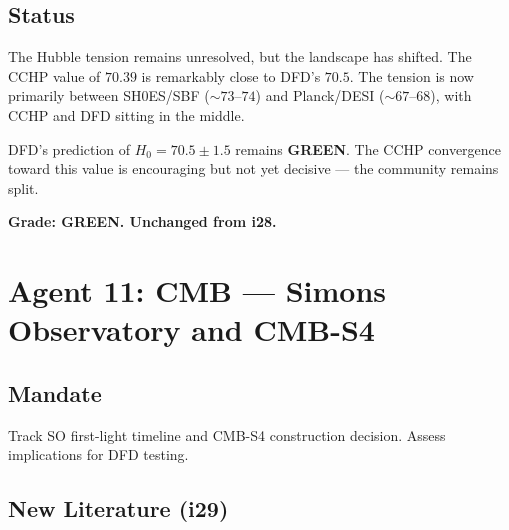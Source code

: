 \documentclass[11pt,a4paper]{article}
\begin{document}
\subsection{Status}

The Hubble tension remains unresolved, but the landscape has shifted. The CCHP value of $70.39$ is remarkably close to DFD's $70.5$. The tension is now primarily between SH0ES/SBF ($\sim 73$--$74$) and Planck/DESI ($\sim 67$--$68$), with CCHP and DFD sitting in the middle.

DFD's prediction of $H_0 = 70.5 \pm 1.5$ remains \textbf{GREEN}. The CCHP convergence toward this value is encouraging but not yet decisive --- the community remains split.

\textbf{Grade: GREEN. Unchanged from i28.}

\section{Agent 11: CMB --- Simons Observatory and CMB-S4}

\subsection{Mandate}
Track SO first-light timeline and CMB-S4 construction decision. Assess implications for DFD testing.

\subsection{New Literature (i29)}
\end{document}
